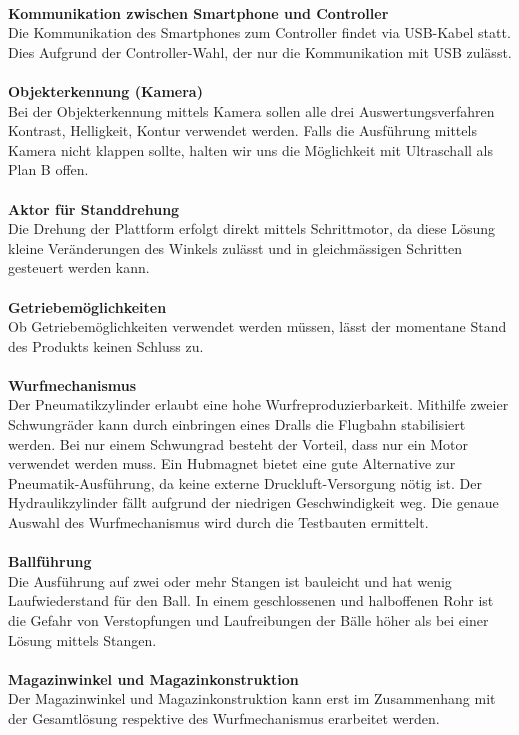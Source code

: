 	\\
	\textbf{Kommunikation zwischen Smartphone und Controller}\\
	Die Kommunikation des Smartphones zum Controller findet via USB-Kabel statt. Dies Aufgrund der Controller-Wahl, der nur die Kommunikation mit USB zulässt.\\
	\\
	\textbf{Objekterkennung (Kamera)}\\
	Bei der Objekterkennung mittels Kamera sollen alle drei Auswertungsverfahren Kontrast, Helligkeit, Kontur verwendet werden. Falls die Ausführung mittels Kamera nicht klappen sollte, halten wir uns die Möglichkeit mit Ultraschall als Plan B offen.\\
	\\
	\textbf{Aktor für Standdrehung}\\
	Die Drehung der Plattform erfolgt direkt mittels Schrittmotor, da diese Lösung kleine Veränderungen des Winkels zulässt und in gleichmässigen Schritten gesteuert werden kann.\\
	\\
	\textbf{Getriebemöglichkeiten}\\
	Ob Getriebemöglichkeiten verwendet werden müssen, lässt der momentane Stand des Produkts keinen Schluss zu.\\
	\\
	\textbf{Wurfmechanismus}\\
	Der Pneumatikzylinder erlaubt eine hohe Wurfreproduzierbarkeit. Mithilfe zweier Schwungräder kann durch einbringen eines Dralls die Flugbahn stabilisiert werden. Bei nur einem Schwungrad besteht der Vorteil, dass nur ein Motor verwendet werden muss. Ein Hubmagnet bietet eine gute Alternative zur Pneumatik-Ausführung, da keine externe Druckluft-Versorgung nötig ist. Der Hydraulikzylinder fällt aufgrund der niedrigen Geschwindigkeit weg. Die genaue Auswahl des Wurfmechanismus wird durch die Testbauten ermittelt.\\
	\\
	\textbf{Ballführung}\\
	Die Ausführung auf zwei oder mehr Stangen ist bauleicht und hat wenig Laufwiederstand für den Ball. In einem geschlossenen und halboffenen Rohr ist die Gefahr von Verstopfungen und Laufreibungen der Bälle höher als bei einer Lösung mittels Stangen.\\
	\\
	\textbf{Magazinwinkel und Magazinkonstruktion}\\
	Der Magazinwinkel und Magazinkonstruktion kann erst im Zusammenhang mit der Gesamtlösung respektive des Wurfmechanismus erarbeitet werden.\\
